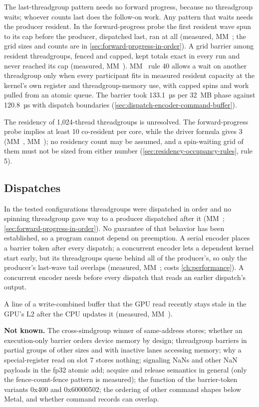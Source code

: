 The last-threadgroup pattern needs no forward progress, because no threadgroup waits; whoever counts last does the
follow-on work. Any pattern that waits needs the producer resident. In the forward-progress probe the first resident
wave spun to its cap before the producer, dispatched last, ran at all (measured, MM~; the grid sizes and
counts are in \cref{sec:forward-progress-in-order}). A grid barrier among resident
threadgroups, fenced and capped, kept totals exact in every run and never reached its cap (measured, MM~).
MM~ rule 40 allows a wait on another threadgroup only when every participant fits in measured resident capacity
at the kernel's own register and threadgroup-memory use, with capped spins and work pulled from an atomic queue. The barrier took
133.1~µs per 32~MB phase against 120.8~µs with dispatch boundaries (\cref{sec:dispatch-encoder-command-buffer}).

The residency of 1,024-thread threadgroups is unresolved. The forward-progress probe implies at least
10 co-resident per core, while the driver formula gives 3 (MM~, MM~); no residency count may be assumed, and
a spin-waiting grid of them must not be sized from either number (\cref{sec:residency-occupancy-rules}, rule 5).

\subsection*{Dispatches}

In the tested configurations threadgroups were dispatched in order and no spinning threadgroup gave way to a producer
dispatched after it (MM~; \cref{sec:forward-progress-in-order}). No guarantee of that behavior has been
established, so a program cannot depend on preemption. A serial encoder places
a barrier token after every dispatch; a concurrent encoder lets a dependent kernel start early, but its threadgroups queue
behind all of the producer's, so only the producer's last-wave tail overlaps (measured, MM~; costs \cref{ch:performance}).
A concurrent encoder needs  before every dispatch that reads
an earlier dispatch's output.

A line of a write-combined buffer that the GPU read recently stays stale in the GPU's L2 after the CPU updates it
(measured, MM~).

\textbf{Not known.} The cross-simdgroup winner of same-address stores; whether an execution-only barrier orders device
memory by design; threadgroup barriers in partial groups of other sizes and with inactive lanes accessing memory; why a
special-register read on slot 7 stores nothing; signaling NaNs and other NaN payloads in the fp32 atomic add; acquire and
release semantics in general (only the fence-count-fence pattern is measured); the function of the barrier-token
variants 0x400 and 0x60000502; the ordering of other command shapes below Metal, and whether command records can
overlap.

